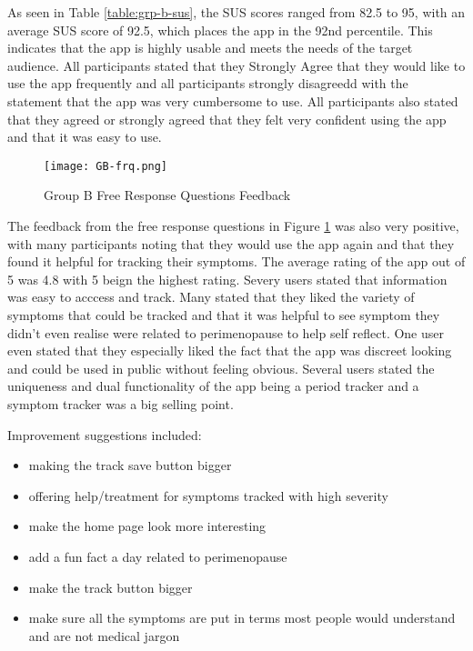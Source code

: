     As seen in Table \ref{table:grp-b-sus}, the SUS scores ranged from 82.5 to 95, with an average SUS score of 92.5, which places the app in the 92nd percentile. This indicates that the app is highly usable and meets the needs of the target audience. All participants stated that they Strongly Agree that they would like to use the app frequently and all participants strongly disagreedd with the statement that the app was very cumbersome to use. All participants also stated that they agreed or strongly agreed that they felt very confident using the app and that it was easy to use. 

    \begin{figure}[h!!]
        \begin{center}
          \texttt{[image: GB-frq.png]}
          \caption{Group B Free Response Questions Feedback}
          \label{figure:gb-frq}
        \end{center}
      \end{figure}

The feedback from the free response questions in Figure \ref{figure:gb-frq} was also very positive, with many participants noting that they would use the app again and that they found it helpful for tracking their symptoms. The average rating of the app out of 5 was 4.8 with 5 beign the highest rating. Severy users stated that information was easy to acccess and track. Many stated that they liked the variety of symptoms that could be tracked and that it was helpful to see symptom they didn't even realise were related to perimenopause to help self reflect. One user even stated that they especially liked the fact that the app was discreet looking and could be used in public without feeling obvious. Several users stated the uniqueness and dual functionality of the app being a period tracker and a symptom tracker was a big selling point.  

Improvement suggestions included:
\begin{itemize}
    \item making the track save button bigger
    \item offering help/treatment for symptoms tracked with high severity
    \item make the home page look more interesting
    \item add a fun fact a day related to perimenopause
    \item make the track button bigger
    \item make sure all the symptoms are put in terms most people would understand and are not medical jargon
\end{itemize}

